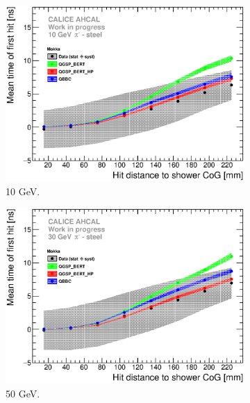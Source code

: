 \begin{figure}[htbp!]
  \begin{subfigure}[t]{0.49\textwidth}
    \centering
    \includegraphics[width=1\textwidth]{../Thesis_Plots/Timing/Pions/Plots/ComparisonToSim/Time_Radius_10GeV_SSF_Mokka.eps}
    \caption{10 GeV.} \label{fig:Radius_SSF_SimData_10GeV}
  \end{subfigure}
  \hfill
  \begin{subfigure}[t]{0.49\textwidth}
    \centering
    \includegraphics[width=1\textwidth]{../Thesis_Plots/Timing/Pions/Plots/ComparisonToSim/Time_Radius_30GeV_SSF_Mokka.eps}
    \caption{50 GeV.} \label{fig:Radius_SSF_SimData_30GeV}
  \end{subfigure}
  \hfill
  \begin{subfigure}[t]{0.49\textwidth}

\end{subfigure}
\end{figure}

